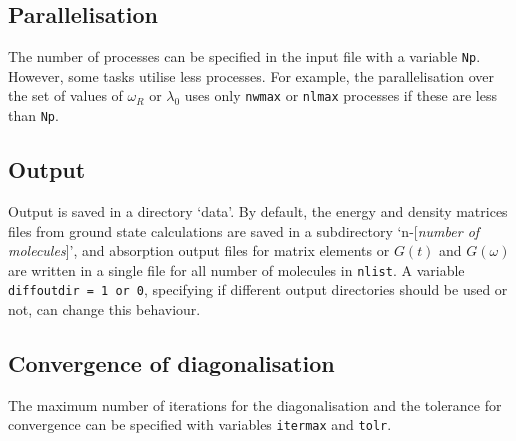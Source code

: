 \documentclass[final,twocolumn]{elsarticle}
\begin{document}
\begin{small}
\subsection{Parallelisation}
The number of processes can be specified in the input file 
with a variable \texttt{Np}. 
However, some tasks utilise less processes. For example,
the parallelisation over the set of values of $\omega_R$ or $\lambda_0$
 uses only \texttt{nwmax} or \texttt{nlmax}
processes if these are less than \texttt{Np}.

\subsection{Output}
Output is saved in a directory `data'.
By default,
the energy and density matrices files from ground state calculations
are saved in a subdirectory `n-[{\it number of molecules}]',
and absorption output files for matrix elements or $G(t)$ and $G(\omega)$
are written in a single file for all number of molecules in \texttt{nlist}.
A variable \texttt{diffoutdir = 1 or 0}, specifying if 
different output directories should be used or not,
can change this behaviour.

\subsection{Convergence of diagonalisation}
The maximum number of iterations for the diagonalisation
 and the tolerance for convergence can be specified with variables
\texttt{itermax} and \texttt{tolr}.

















\begin{displaymath}
\end{displaymath}


\vspace{2cm}


\end{small}
\end{document}
